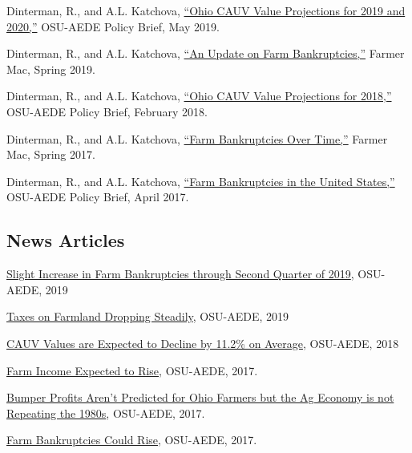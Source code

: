 \documentclass[letterpaper]{article}
\renewenvironment{itemize}{
  \begin{list}{}{
    \setlength{\leftmargin}{1.5em}
  }
}{
  \end{list}
}
\begin{document}
\begin{itemize}
\item Dinterman, R., and A.L. Katchova, \href{https://aede.osu.edu/sites/aede/files/publication_files/CAUVProjectionsReport2019.pdf}{``Ohio CAUV Value Projections for 2019 and 2020,''} OSU-AEDE Policy Brief, May 2019.
\item Dinterman, R., and A.L. Katchova, \href{https://www.farmermac.com/wp-content/uploads/The-Feed-Spring-2019.pdf}{``An Update on Farm Bankruptcies,''} Farmer Mac, Spring 2019.
\item Dinterman, R., and A.L. Katchova, \href{https://aede.osu.edu/sites/aede/files/publication_files/2018CAUVProjectionsReport.pdf}{``Ohio CAUV Value Projections for 2018,''} OSU-AEDE Policy Brief, February 2018.
\item Dinterman, R., and A.L. Katchova, \href{https://www.farmermac.com/wp-content/uploads/The-Feed-Spring-2017.pdf}{``Farm Bankruptcies Over Time,''} Farmer Mac, Spring 2017.
\item Dinterman, R., and A.L. Katchova, \href{https://aede.osu.edu/sites/aede/files/publication_files/Farm%20Bankruptcies%20-%20Policy%20Brief.pdf}{``Farm Bankruptcies in the United States,''} OSU-AEDE Policy Brief, April 2017.
\end{itemize}

\subsection*{News Articles}

\begin{itemize}
\item \href{https://aede.osu.edu/sites/aede/files/publication_files/BankruptcyUpdate2019Q2.pdf}{Slight Increase in Farm Bankruptcies through Second Quarter of 2019}, OSU-AEDE, 2019
\item \href{https://aede.osu.edu/news/taxes-farmland-dropping-steadily}{Taxes on Farmland Dropping Steadily}, OSU-AEDE, 2019
\item \href{https://aede.osu.edu/news/cauv-values-agricultural-land-are-expected-decline-112-acre-average}{CAUV Values are Expected to Decline by 11.2\% on Average}, OSU-AEDE, 2018
\item \href{https://aede.osu.edu/news/farm-income-expected-rise}{Farm Income Expected to Rise}, OSU-AEDE, 2017.
\item \href{https://aede.osu.edu/news/bumper-profits-arent-predicted-ohio-farmers-ag-economy-not-repeating-1980s}{Bumper Profits Aren't Predicted for Ohio Farmers but the Ag Economy is not Repeating the 1980s}, OSU-AEDE, 2017.
\item \href{https://aede.osu.edu/news/farm-bankruptcies-could-rise}{Farm Bankruptcies Could Rise}, OSU-AEDE, 2017.
\end{itemize}
\end{document}
